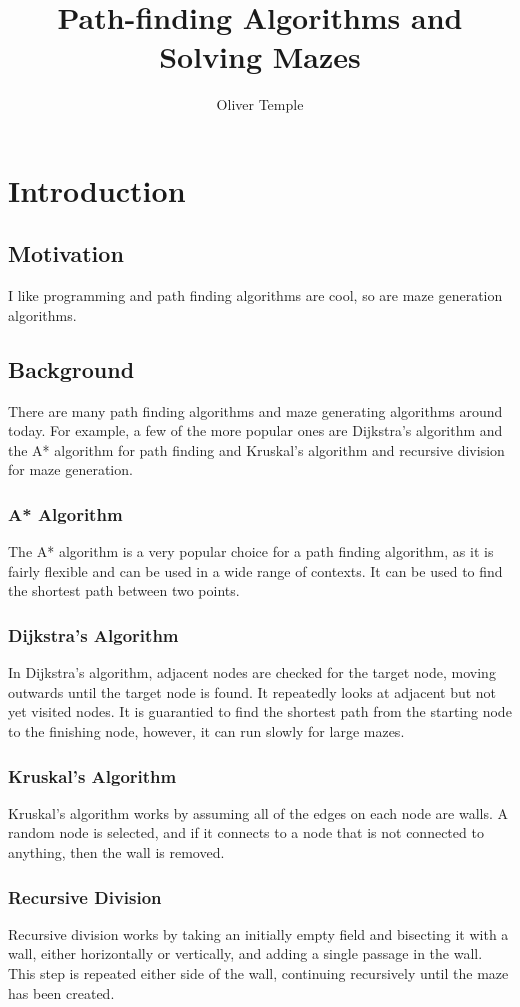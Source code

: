 \documentclass{article}
\title{Path-finding Algorithms and Solving Mazes}
\author{Oliver Temple}
\begin{document}
\maketitle
\tableofcontents

\section{Introduction}
\subsection{Motivation}
I like programming and path finding algorithms are cool, so are maze generation algorithms.
\subsection{Background}
There are many path finding algorithms and maze generating algorithms around today. For example, a few of the more popular ones are Dijkstra's algorithm and the A* algorithm for path finding and Kruskal's algorithm and recursive division for maze generation.
\subsubsection{A* Algorithm}
The A* algorithm is a very popular choice for a path finding algorithm, as it is fairly flexible and can be used in a wide range of contexts. It can be used to find the shortest path between two points.\cite{astart}

\subsubsection{Dijkstra's Algorithm}
In Dijkstra's algorithm, adjacent nodes are checked for the target node, moving outwards until the target node is found. It repeatedly looks at adjacent but not yet visited nodes. It is guarantied to find the shortest path from the starting node to the finishing node, however, it can run slowly for large mazes.
\cite{astart}

\subsubsection{Kruskal's Algorithm}
Kruskal's algorithm works by assuming all of the edges on each node are walls. A random node is selected, and if it connects to a node that is not connected to anything, then the wall is removed. \cite{Kruskal}
\subsubsection{Recursive Division}
Recursive division works by taking an initially empty field and bisecting it with a wall, either horizontally or vertically, and adding a single passage in the wall. This step is repeated either side of the wall, continuing recursively until the maze has been created.\cite{Recursive}
\end{document}
